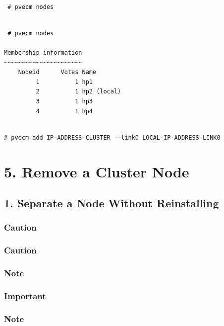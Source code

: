 \begin{lstlisting}

 # pvecm nodes

\end{lstlisting}

\begin{lstlisting}

 # pvecm nodes

Membership information
~~~~~~~~~~~~~~~~~~~~~~
    Nodeid      Votes Name
         1          1 hp1
         2          1 hp2 (local)
         3          1 hp3
         4          1 hp4

\end{lstlisting}

\begin{lstlisting}

# pvecm add IP-ADDRESS-CLUSTER --link0 LOCAL-IP-ADDRESS-LINK0

\end{lstlisting}


\section{5. Remove a Cluster Node}

\subsection{1. Separate a Node Without Reinstalling}

\subsubsection{Caution}

\subsubsection{Caution}

\subsubsection{Note}

\subsubsection{Important}

\subsubsection{Note}

